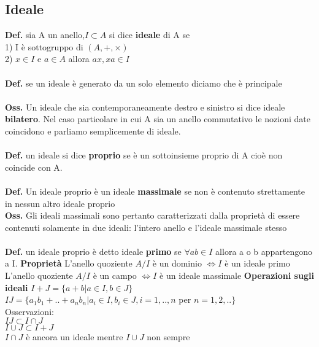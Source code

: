 \documentclass[10pt,a4paper]{article}
\begin{document}
\subsection{Ideale}
\textbf{Def.} sia A un anello,$I \subset A$ si dice \textbf{ideale} di A se\\
1) I è sottogruppo di $(A,+,\times)$\\
2) $x \in I$ e $a \in A$ allora $ax,xa \in I$\\\\
\textbf{Def.} se un ideale è generato da un solo elemento diciamo che è principale\\\\
\textbf{Oss.} Un ideale che sia contemporaneamente destro e sinistro si dice ideale \textbf{bilatero}. Nel caso particolare in cui A sia un anello commutativo le nozioni date coincidono e parliamo semplicemente di ideale.\\\\
\textbf{Def.} un ideale si dice \textbf{proprio} se è un sottoinsieme proprio di A cioè non coincide con A.\\\\
\textbf{Def.} Un ideale proprio è un ideale \textbf{massimale} se non è contenuto strettamente in nessun altro ideale proprio\\
\textbf{Oss.} Gli ideali massimali sono pertanto caratterizzati dalla proprietà di essere contenuti solamente in due ideali: l'intero anello e l'ideale massimale stesso\\\\
\textbf{Def.} un ideale proprio è detto ideale \textbf{primo} se $\forall ab \in I$ allora a o b appartengono a I.
\textbf{Proprietà}
L'anello quoziente $A/I$ è un dominio $\iff I$ è un ideale primo\\
L'anello quoziente $A/I$ è un campo $\iff I$ è un ideale massimale
\textbf{Operazioni sugli ideali}
$I+J = \{a+b|a \in I, b \in J\}$\\
$IJ = \{a_1b_1+..+a_n b_n| a_i \in I,b_i \in J,i=1,..,n$ per $n=1,2,..\}$\\
Osservazioni: \\
$IJ \subset I \cap J$\\ 
$I \cup J \subset I+J$\\
$I \cap J$ è ancora un ideale mentre $I \cup J$ non sempre
\end{document}
